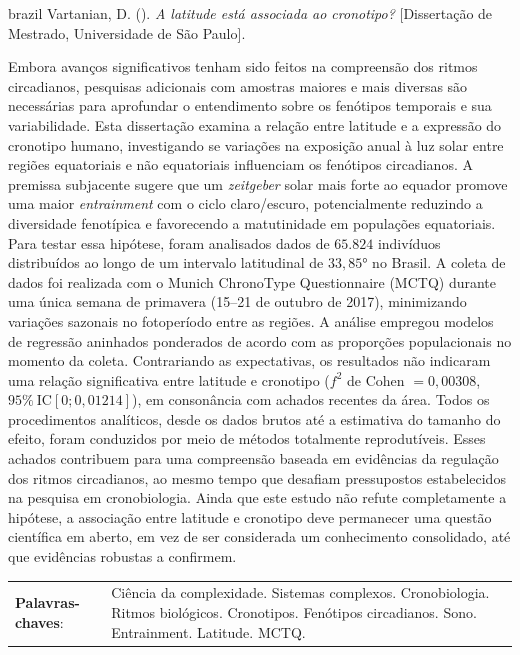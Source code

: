 \documentclass[
12pt,
openright,
oneside,
a4paper,
chapter=TITLE,
section=TITLE,
french,
spanish,
brazil,
english
]{abntex2}
\newcommand{\resumoestrangeironame}{Resumo}
\renewcommand{\resumoname}{Abstract}
\renewcommand{\resumoestrangeironame}{Resumo}
\renewcommand{\resumoname}{Resumo}
\renewcommand{\resumoestrangeironame}{Abstract}
\renewcommand{\resumoname}{Resumen}
\renewcommand{\resumoestrangeironame}{Resumo}
\renewcommand{\resumoname}{Résumé}
\renewcommand{\resumoestrangeironame}{Resumo}
\newenvironment{resumoenv}[1][\resumoname]{
  \pretextualchapter{#1}
  \begingroup
  \setlength{\parindent}{0cm}
  \setlength{\parskip}{\smallskipamount} %
  \AtBeginEnvironment{tabular}{\normalsize}
  \renewcommand{\arraystretch}{1}
  \setlength{\aboverulesep}{0ex}
  \setlength{\belowrulesep}{0ex}
  \setlength{\arrayrulewidth}{0pt}
  \setlength{\tabcolsep}{0cm}
  \vspace{-\smallskipamount} %
  \begin{SingleSpace}
}{
  \end{SingleSpace}
  \cleardoublepage
  \endgroup
}
\renewcommand{\arraystretch}{1.5}
\begin{document}

\begin{resumoenv}[\resumoestrangeironame]
\begin{otherlanguage*}{brazil}
Vartanian, D. ({\imprimirdata}). \textit{A latitude está associada ao cronotipo?} [Dissertação de Mestrado, Universidade de São Paulo].


Embora avanços significativos tenham sido feitos na compreensão dos
ritmos circadianos, pesquisas adicionais com amostras maiores e mais
diversas são necessárias para aprofundar o entendimento sobre os
fenótipos temporais e sua variabilidade. Esta dissertação examina a
relação entre latitude e a expressão do cronotipo humano, investigando
se variações na exposição anual à luz solar entre regiões equatoriais e
não equatoriais influenciam os fenótipos circadianos. A premissa
subjacente sugere que um \emph{zeitgeber} solar mais forte ao equador
promove uma maior \emph{entrainment} com o ciclo claro/escuro,
potencialmente reduzindo a diversidade fenotípica e favorecendo a
matutinidade em populações equatoriais. Para testar essa hipótese, foram
analisados dados de \(65.824\) indivíduos distribuídos ao longo de um
intervalo latitudinal de \(33,85°\) no Brasil. A coleta de dados foi
realizada com o Munich ChronoType Questionnaire (MCTQ) durante uma única
semana de primavera (15--21 de outubro de 2017), minimizando variações
sazonais no fotoperíodo entre as regiões. A análise empregou modelos de
regressão aninhados ponderados de acordo com as proporções populacionais
no momento da coleta. Contrariando as expectativas, os resultados não
indicaram uma relação significativa entre latitude e cronotipo (\(f^2\)
de Cohen \(= 0,00308\), \(95\% \ \text{IC}[0; 0,01214]\)), em
consonância com achados recentes da área. Todos os procedimentos
analíticos, desde os dados brutos até a estimativa do tamanho do efeito,
foram conduzidos por meio de métodos totalmente reprodutíveis. Esses
achados contribuem para uma compreensão baseada em evidências da
regulação dos ritmos circadianos, ao mesmo tempo que desafiam
pressupostos estabelecidos na pesquisa em cronobiologia. Ainda que este
estudo não refute completamente a hipótese, a associação entre latitude
e cronotipo deve permanecer uma questão científica em aberto, em vez de
ser considerada um conhecimento consolidado, até que evidências robustas
a confirmem.


\begin{tabular}{p{4cm} p{11.9cm}}
  \textbf{Palavras-chaves}: &  Ciência da complexidade. Sistemas complexos. Cronobiologia. Ritmos biológicos. Cronotipos. Fenótipos circadianos. Sono. Entrainment. Latitude. MCTQ.
\end{tabular}
\end{otherlanguage*}
\end{resumoenv}
\end{document}
